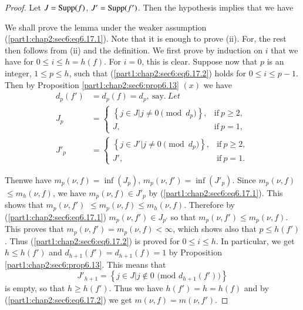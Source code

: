 \begin{proof}
  Let $J= \operatorname{Supp} (f)$, $J' = \operatorname{Supp} (f')$. Then the hypothesis implies that we have

We shall prove the lemma under the weaker assumption (\ref{part1:chap2:sec6:eq6.17.1}). Note that it is enough to prove (ii). For, the rest then follows from (ii) and the definition. We first prove by induction on $i$ that we have
for $0 \leq i \leq h= h(f)$. For $i=0$, this is clear. Suppose now that $p$ is an integer, $1 \leq p \leq h$, such that (\ref{part1:chap2:sec6:eq6.17.2}) holds for $0 \leq i \leq p-1$. Then by Proposition \ref{part1:chap2:sec6:prop6.13}  $(x)$ we have 
\begin{align*}
  d_p (f') & = d_p (f) = d_p, ~\text{say}.~ Let\\
  J_p & = \begin{cases}
    \left\{ j \in J \Big| j \neq 0 \pmod{d_p} \right\}, & \text{if}~ p \geq 2,\\
    J, & \text{if}~ p=1,
  \end{cases}\\
  J'_p & = \begin{cases}
    \left\{ j \in J' \Big| j \neq 0 \pmod{d_p} \right\}, & \text{if}~ p \geq 2,\\
    J', & \text{if}~ p=1.
  \end{cases}
\end{align*}

Then\pageoriginale we have $m_p (\nu, f)= \inf (J_p)$, $m_p (\nu, f')
= \inf (J'_p)$. Since $m_p (\nu, f)$ $\leq m_h (\nu, f)$, we have $m_p
(\nu, f)\in J'_p$ by (\ref{part1:chap2:sec6:eq6.17.1}). This shows
that $m_p(\nu, f')$ $\leq m_p (\nu, f) \leq m_h (\nu, f)$. Therefore by
(\ref{part1:chap2:sec6:eq6.17.1}) $m_p (\nu, f') \in J_{p'}$ so that
$m_p (\nu, f') \leq m_p (\nu, f)$. This proves that $m_p (\nu, f')=
m_p (\nu, f)< \infty$, which shows also that $p \leq h(f')$. Thus
(\ref{part1:chap2:sec6:eq6.17.2}) is proved for $0 \leq i \leq h$. In
particular, we get $h \leq h(f')$ and $d_{h+1} (f')= d_{h+1} (f)=1$ by
Proposition \ref{part1:chap2:sec6:prop6.13}. This means that 
$$
J'_{h+1} = \left\{ j \in J \Big| j \notin 0 \text{ (mod } d_{h+1} (f')) \right\}
$$
is empty, so that $h \geq h(f')$. Thus we have $h(f')= h= h(f)$ and by (\ref{part1:chap2:sec6:eq6.17.2}) we  get $m (\nu, f)= m(\nu, f')$.
\end{proof}
